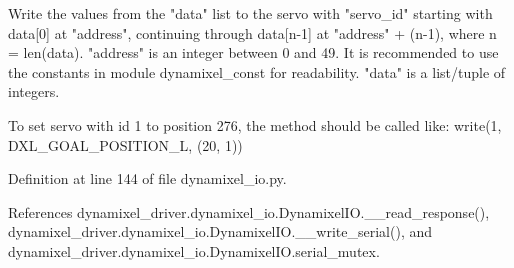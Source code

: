 \begin{DoxyVerb}Write the values from the "data" list to the servo with "servo_id"
starting with data[0] at "address", continuing through data[n-1] at
"address" + (n-1), where n = len(data). "address" is an integer between
0 and 49. It is recommended to use the constants in module dynamixel_const
for readability. "data" is a list/tuple of integers.

To set servo with id 1 to position 276, the method should be called
like:
    write(1, DXL_GOAL_POSITION_L, (20, 1))
\end{DoxyVerb}
 

Definition at line 144 of file dynamixel\+\_\+io.\+py.



References dynamixel\+\_\+driver.\+dynamixel\+\_\+io.\+Dynamixel\+I\+O.\+\_\+\+\_\+read\+\_\+response(), dynamixel\+\_\+driver.\+dynamixel\+\_\+io.\+Dynamixel\+I\+O.\+\_\+\+\_\+write\+\_\+serial(), and dynamixel\+\_\+driver.\+dynamixel\+\_\+io.\+Dynamixel\+I\+O.\+serial\+\_\+mutex.



